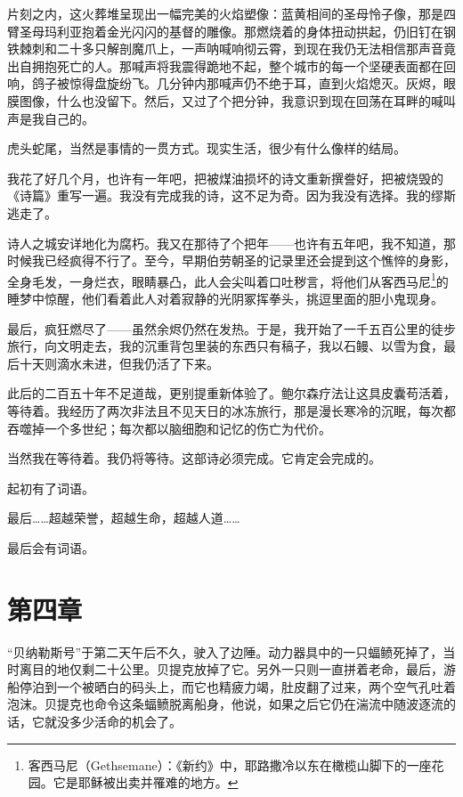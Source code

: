 \documentclass[AutoFakeBold=true]{book}
\begin{document}
片刻之内，这火葬堆呈现出一幅完美的火焰塑像：蓝黄相间的圣母怜子像，那是四臂圣母玛利亚抱着金光闪闪的基督的雕像。那燃烧着的身体扭动拱起，仍旧钉在钢铁棘刺和二十多只解剖魔爪上，一声呐喊响彻云霄，到现在我仍无法相信那声音竟出自拥抱死亡的人。那喊声将我震得跪地不起，整个城市的每一个坚硬表面都在回响，鸽子被惊得盘旋纷飞。几分钟内那喊声仍不绝于耳，直到火焰熄灭。灰烬，眼膜图像，什么也没留下。然后，又过了个把分钟，我意识到现在回荡在耳畔的喊叫声是我自己的。

\vspace*{1em}

虎头蛇尾，当然是事情的一贯方式。现实生活，很少有什么像样的结局。

我花了好几个月，也许有一年吧，把被煤油损坏的诗文重新撰誊好，把被烧毁的《诗篇》重写一遍。我没有完成我的诗，这不足为奇。因为我没有选择。我的缪斯逃走了。

诗人之城安详地化为腐朽。我又在那待了个把年——也许有五年吧，我不知道，那时候我已经疯得不行了。至今，早期伯劳朝圣的记录里还会提到这个憔悴的身影，全身毛发，一身烂衣，眼睛暴凸，此人会尖叫着口吐秽言，将他们从客西马尼\footnote{客西马尼（Gethsemane）：《新约》中，耶路撒冷以东在橄榄山脚下的一座花园。它是耶稣被出卖并罹难的地方。}的睡梦中惊醒，他们看着此人对着寂静的光阴冢挥拳头，挑逗里面的胆小鬼现身。

最后，疯狂燃尽了——虽然余烬仍然在发热。于是，我开始了一千五百公里的徒步旅行，向文明走去，我的沉重背包里装的东西只有稿子，我以石鳗、以雪为食，最后十天则滴水未进，但我仍活了下来。

此后的二百五十年不足道哉，更别提重新体验了。鲍尔森疗法让这具皮囊苟活着，等待着。我经历了两次非法且不见天日的冰冻旅行，那是漫长寒冷的沉眠，每次都吞噬掉一个多世纪；每次都以脑细胞和记忆的伤亡为代价。

当然我在等待着。我仍将等待。这部诗必须完成。它肯定会完成的。

起初有了词语。

最后……超越荣誉，超越生命，超越人道……

最后会有词语。

\chapter{第四章}

``贝纳勒斯号''于第二天午后不久，驶入了边陲。动力器具中的一只蝠鲼死掉了，当时离目的地仅剩二十公里。贝提克放掉了它。另外一只则一直拼着老命，最后，游船停泊到一个被晒白的码头上，而它也精疲力竭，肚皮翻了过来，两个空气孔吐着泡沫。贝提克也命令这条蝠鲼脱离船身，他说，如果之后它仍在湍流中随波逐流的话，它就没多少活命的机会了。
\end{document}
